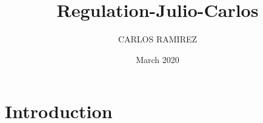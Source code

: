\documentclass{article}
\title{Regulation-Julio-Carlos}
\author{CARLOS RAMIREZ}
\date{March 2020}
\begin{document}
\maketitle

\section{Introduction}
\end{document}
